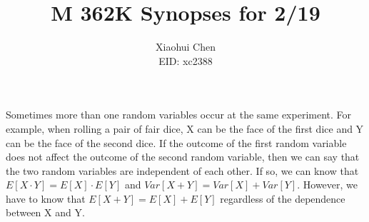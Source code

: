 \documentclass[12pt]{article}
\author{Xiaohui Chen \\EID: xc2388}
\title{M 362K Synopses for 2/19}
\begin{document}
\maketitle
\begin{spacing}{2.0}

Sometimes more than one random variables occur at the same experiment. For example, when rolling a pair of fair dice, X can be the face of the first dice and Y can be the face of the second dice. If the outcome of the first random variable does not affect the outcome of the second random variable, then we can say that the two random variables are independent of each other. If so, we can know that $E[X\cdot Y]= E[X]\cdot E[Y]$ and $Var[X+Y]= Var[X]+ Var[Y]$. However, we have to know that $E[X+Y]=E[X]+E[Y]$ regardless of the dependence between X and Y.

\end{spacing}
\end{document}
